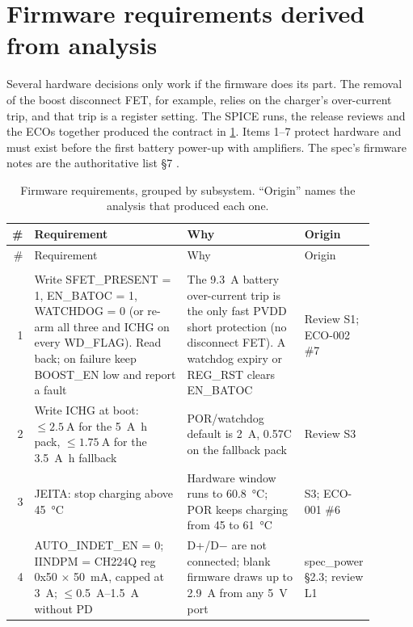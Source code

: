 \section{Firmware requirements derived from analysis}\label{sec:firmware-req}

Several hardware decisions only work if the firmware does its part. The removal of the boost disconnect FET, for example, relies on the charger's over-current trip, and that trip is a register setting. The SPICE runs, the release reviews and the ECOs together produced the contract in \cref{tab:firmware-req}. Items 1--7 protect hardware and must exist before the first battery power-up with amplifiers. The spec's firmware notes are the authoritative list  §7 .

{\small
\setlength{\tabcolsep}{4pt}
\begin{longtable}{@{}r >{\raggedright\arraybackslash}p{0.43\linewidth} >{\raggedright\arraybackslash}p{0.33\linewidth} >{\raggedright\arraybackslash}p{0.13\linewidth}@{}}
\caption{Firmware requirements, grouped by subsystem. ``Origin'' names the analysis that produced each one.}\label{tab:firmware-req}\\
\toprule
\# & Requirement & Why & Origin \\
\midrule
\endfirsthead
\toprule \# & Requirement & Why & Origin \\ \midrule
\endhead
\bottomrule
\endfoot
\multicolumn{4}{@{}l}{\textbf{Charger (BQ25792, 0x6B): first thing at every boot}} \\
1 & Write SFET\_PRESENT = 1, EN\_BATOC = 1, WATCHDOG = 0 (or re-arm all three and ICHG on every WD\_FLAG). Read back; on failure keep BOOST\_EN low and report a fault & The \qty{9.3}{\ampere} battery over-current trip is the only fast PVDD short protection (no disconnect FET). A watchdog expiry or REG\_RST clears EN\_BATOC & Review S1; ECO-002 \#7 \\
2 & Write ICHG at boot: $\le\qty{2.5}{\ampere}$ for the \qty{5}{\ampere\hour} pack, $\le\qty{1.75}{\ampere}$ for the \qty{3.5}{\ampere\hour} fallback & POR/watchdog default is \qty{2}{\ampere}, 0.57C on the fallback pack & Review S3 \\
3 & JEITA: stop charging above \qty{45}{\degreeCelsius} & Hardware window runs to \qty{60.8}{\degreeCelsius}; POR keeps charging from 45 to \qty{61}{\degreeCelsius} & S3; ECO-001 \#6 \\
4 & AUTO\_INDET\_EN = 0; IINDPM = CH224Q reg 0x50 $\times$ \qty{50}{\milli\ampere}, capped at \qty{3}{\ampere}; $\le$\qtyrange{0.5}{1.5}{\ampere} without PD & D+/D$-$ are not connected; blank firmware draws up to \qty{2.9}{\ampere} from any \qty{5}{\volt} port & spec\_power §2.3; review L1 \\

\end{longtable}}
